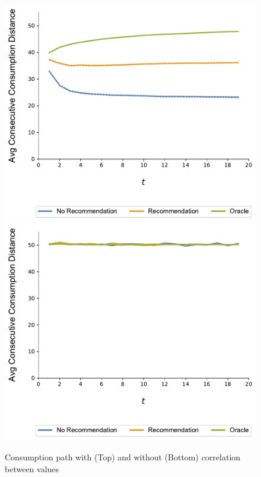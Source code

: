 \documentclass[sigconf]{acmart}
\begin{document}
\begin{figure}[t]
\includegraphics[width=.9\linewidth]{figures/rho_pos_consumption_dist_N_200T_20_overall.pdf}\\
\includegraphics[width=.9\linewidth]{figures/rho_zero_consumption_dist_N_200T_20_overall.pdf}\\
\caption{Consumption path with (Top) and without (Bottom) correlation between values}
\label{fig:correlation_consumption_path}
\end{figure}
\end{document}
